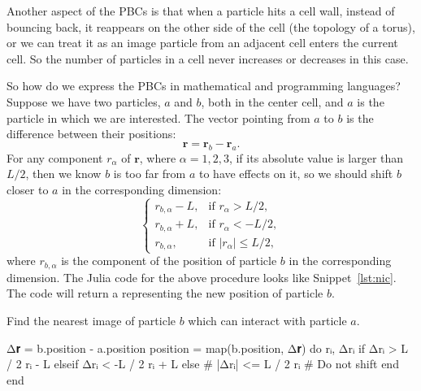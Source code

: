 Another aspect of the PBCs is that when a particle hits a cell wall, instead of bouncing
back, it reappears on the other side of the cell (the topology of a torus), or we can
treat it as an image particle from an adjacent cell enters the current cell.
So the number of particles in a cell never increases or decreases in this case.

So how do we express the PBCs in mathematical and programming languages?
Suppose we have two particles, $a$ and $b$, both in the center cell,
and $a$ is the particle in which we
are interested. The vector pointing from $a$ to $b$ is the difference between
their positions:
%
\begin{equation}
    \bm{r} = \bm{r}_b - \bm{r}_a.
\end{equation}
%
For any component $r_\alpha$ of $\bm{r}$, where $\alpha = 1, 2, 3$, if its absolute value
is larger than $L / 2$, then we know $b$ is too far from $a$ to have effects on it,
so we should shift $b$ closer to $a$ in the corresponding dimension:
%
\begin{equation}
    \begin{cases}
        r_{b, \alpha} - L, & \text{if } r_\alpha > L / 2,                  \\
        r_{b, \alpha} + L, & \text{if } r_\alpha < -L / 2,                 \\
        r_{b, \alpha},     & \text{if } \lvert r_\alpha \rvert \leq L / 2,
    \end{cases}
\end{equation}
%
where $r_{b, \alpha}$ is the component of the position of particle $b$ in the
corresponding dimension.
The Julia code for the above procedure looks like Snippet~\ref{lst:nic}.
The code will return a  representing the new position of particle $b$.

\begin{algorithm}
    \caption{Find the nearest image of particle $b$ which can interact with particle $a$.}
    \label{lst:nic}
    \begin{juliacode}
        Δ𝐫 = b.position - a.position
        position = map(b.position, Δ𝐫) do rᵢ, Δrᵢ
            if Δrᵢ > L / 2
                rᵢ - L
            elseif Δrᵢ < -L / 2
                rᵢ + L
            else  # |Δrᵢ| <= L / 2
                rᵢ  # Do not shift
            end
        end
    \end{juliacode}
\end{algorithm}

